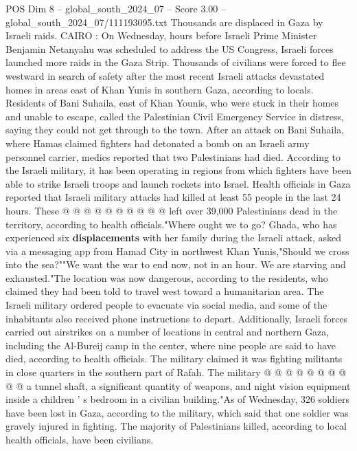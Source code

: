 \begin{textsample}{POS Dim 8 – global\_south\_2024\_07 – Score 3.00 – global\_south\_2024\_07/111193095.txt}  \label{ex:f8_pos_338}
Thousands are displaced in Gaza by Israeli raids.
CAIRO : On Wednesday, hours before Israeli Prime Minister Benjamin Netanyahu was scheduled to address the US Congress, Israeli forces launched more raids in the Gaza Strip.
Thousands of civilians were forced to flee westward in search of safety after the most recent Israeli attacks devastated homes in areas east of Khan Yunis in southern Gaza, according to locals.
Residents of Bani Suhaila, east of Khan Younis, who were stuck in their homes and unable to escape, called the Palestinian Civil Emergency Service in distress, saying they could not get through to the town.
After an attack on Bani Suhaila, where Hamas claimed fighters had detonated a bomb on an Israeli army personnel carrier, medics reported that two Palestinians had died.
According to the Israeli military, it has been operating in regions from which fighters have been able to strike Israeli troops and launch rockets into Israel.
Health officials in Gaza reported that Israeli military attacks had killed at least 55 people in the last 24 hours.
These @ @ @ @ @ @ @ @ @ @ left over 39,000 Palestinians dead in the territory, according to health officials."Where ought we to go?
Ghada, who has experienced six \textbf{displacements} with her family during the Israeli attack, asked via a messaging app from Hamad City in northwest Khan Yunis,"Should we cross into the sea?""We want the war to end now, not in an hour.
We are starving and exhausted."The location was now dangerous, according to the residents, who claimed they had been told to travel west toward a humanitarian area.
The Israeli military ordered people to evacuate via social media, and some of the inhabitants also received phone instructions to depart.
Additionally, Israeli forces carried out airstrikes on a number of locations in central and northern Gaza, including the Al-Bureij camp in the center, where nine people are said to have died, according to health officials.
The military claimed it was fighting militants in close quarters in the southern part of Rafah.
The military @ @ @ @ @ @ @ @ @ @ a tunnel shaft, a significant quantity of weapons, and night vision equipment inside a children ' s bedroom in a civilian building."As of Wednesday, 326 soldiers have been lost in Gaza, according to the military, which said that one soldier was gravely injured in fighting.
The majority of Palestinians killed, according to local health officials, have been civilians.

\end{textsample}
